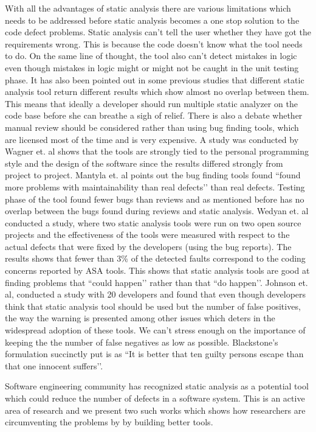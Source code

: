\documentclass[10pt, conference, compsocconf]{IEEEtran}
\begin{document}
With all the advantages of static analysis there are various limitations which needs to be addressed before static analysis becomes a one stop solution to the code defect problems.  Static analysis can’t tell the user whether they have got the requirements wrong. This is because the code doesn’t know what the tool needs to do. On the same line of thought, the tool also can’t detect mistakes in logic even though mistakes in logic might or might not be caught in the unit testing phase. It has also been pointed out in some previous studies that different static analysis tool return different results which show almost no overlap between them. This means that ideally a developer should run multiple static analyzer on the code base before she can breathe a sigh of relief. There is also a debate whether manual review should be considered rather than using bug finding tools, which are licensed most of the time and is very expensive. A study was conducted by Wagner et. al\cite{wagner2005comparing} shows that the tools are strongly tied to the personal programming style and the design of the software since the results differed strongly from project to project. Mantyla et. al\cite{mantyla2009types} points out the bug finding tools found ``found more problems with maintainability than real defects’’ than real defects. Testing phase of the tool found fewer bugs than reviews and as mentioned before has no overlap between the bugs found during reviews and static analysis. Wedyan et. al\cite{wedyan2009effectiveness} conducted a study, where two static analysis tools were run on two open source projects and the effectiveness of the tools were measured with respect to the actual defects that were fixed by the developers  (using the bug reports). The results shows that fewer than 3\% of the detected faults correspond to the coding concerns reported by ASA tools. This shows that static analysis tools are good at finding problems that ``could happen’’ rather than that ``do happen’’. Johnson et. al\cite{johnson2013don}, conducted a study with 20 developers and found that even though developers think that static analysis tool should be used but the number of false positives, the way the warning is presented among other issues which deters in the widespread adoption of these tools. We can’t stress enough on the importance of keeping the the number of false negatives as low as possible. Blackstone’s formulation succinctly put is as ``It is better that ten guilty persons escape than that one innocent suffers’’.

Software engineering community has recognized  static analysis as a potential tool which could reduce the number of defects in a software system. This is an active area of research and we present two such works which shows how researchers are circumventing the problems by by building better tools. 
\end{document}
